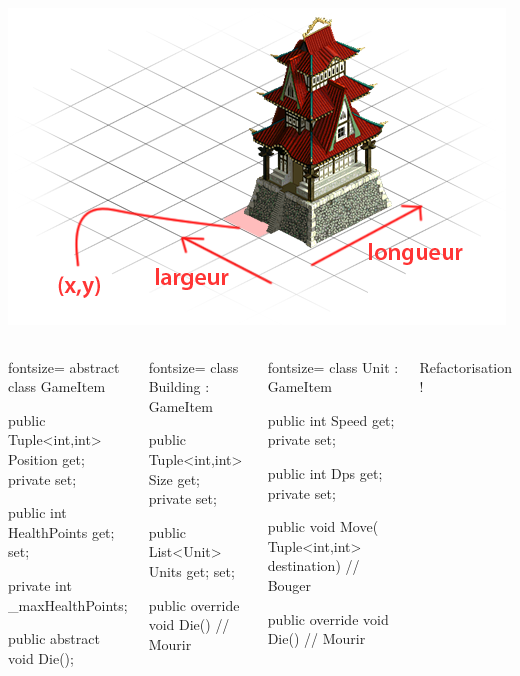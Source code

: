 \documentclass[12pt]{beamer}
\begin{document}
\begin{frame}
    \begin{center}
        \vspace{1.4cm}\includegraphics[scale=0.4]{img/building.png}
    \end{center}
\end{frame}


\begin{frame}[fragile]
    \begin{columns}[c]
        \column{2.3in}
        \begin{csharpcode*}{fontsize=\scriptsize}
abstract class GameItem
{
    public Tuple<int,int> Position
        { get; private set; }

    public int HealthPoints
        { get; set; }
    
    private int _maxHealthPoints;

    public abstract void Die();
}
        \end{csharpcode*}
        \pause
        \begin{csharpcode*}{fontsize=\scriptsize}
class Building : GameItem
{
    public Tuple<int,int> Size
        { get; private set; }

    public List<Unit> Units
        { get; set; }

    public override void Die()
    {
        // Mourir
    }
}
        \end{csharpcode*}
        \column{2.3in}
        \pause
        \begin{csharpcode*}{fontsize=\scriptsize}
class Unit : GameItem
{
    public int Speed
        { get; private set; }

    public int Dps
        { get; private set; }

    public void Move(
        Tuple<int,int> destination)
    {
        // Bouger
    }

    public override void Die()
    {
        // Mourir
    }
}
        \end{csharpcode*}
        \pause
        \begin{center}{\large Refactorisation !}\end{center}
    \end{columns}
\end{frame}
\end{document}
